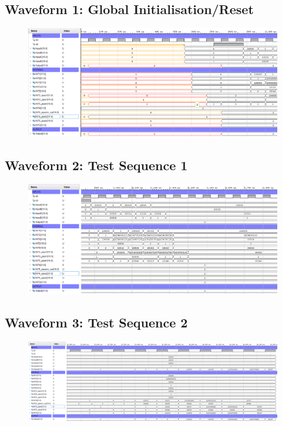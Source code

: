 \documentclass[11pt]{report}
\begin{document}
\subsection*{Waveform 1: Global Initialisation/Reset}
\begin{figure}[H]
    \includegraphics[width=\columnwidth]{Assets/2.2.1_waveform-initial-reset.png}
\end{figure}

\subsection*{Waveform 2: Test Sequence 1}
\begin{figure}[H]
    \includegraphics[width=\columnwidth]{Assets/2.2.1_waveform-test-sequence-1.png}
\end{figure}

\subsection*{Waveform 3: Test Sequence 2}
\begin{figure}[H]
    \includegraphics[width=\columnwidth]{Assets/2.2.1_waveform-test-sequence-2.png}
\end{figure}
\end{document}
